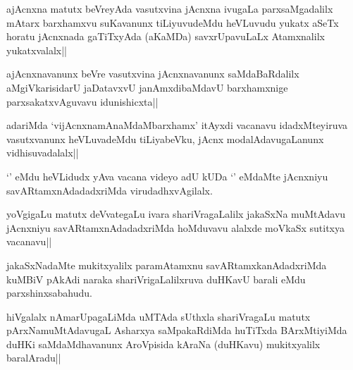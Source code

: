 
\begin{artha}
ajAcnxna matutx beVreyAda vasutxvina jAcnxna ivugaLa parxsaMgadalilx mAtarx barxhamxvu suKavanunx tiLiyuvudeMdu heVLuvudu yukatx aSeTx horatu jAcnxnada gaTiTxyAda (aKaMDa) savxrUpavuLaLx Atamxnalilx yukatxvalalx||
\end{artha}


\begin{artha}
ajAcnxnavanunx beVre vasutxvina jAcnxnavanunx saMdaBaRdalilx aMgiVkarisidarU jaDatavxvU janAmxdibaMdavU barxhamxnige parxsakatxvAguvavu idunishicxta||
\end{artha}

\begin{artha}
adariMda `vijAcnxnamAnaMdaMbarxhamx' itAyxdi vacanavu idadxMteyiruva vasutxvanunx heVLuvadeMdu tiLiyabeVku, jAcnx modalAdavugaLanunx vidhisuvadalalx||
\end{artha}

\begin{artha}
`\stext ' eMdu heVLidudx yAva vacana videyo adU kUDa `\stext ' eMdaMte jAcnxniyu savARtamxnAdadadxriMda virudadhxvAgilalx. 
\end{artha}

\begin{artha}%
yoVgigaLu matutx deVvategaLu ivara shariVragaLalilx jakaSxNa muMtAdavu jAcnxniyu savARtamxnAdadadxriMda hoMduvavu alalxde moVkaSx sutitxya vacanavu||
\end{artha}

\begin{artha}
jakaSxNadaMte mukitxyalilx paramAtamxnu savARtamxkanAdadxriMda kuMBiV pAkAdi naraka shariVrigaLalilxruva duHKavU barali eMdu parxshinxsabahudu.
\end{artha}


\begin{artha}
hiVgalalx nAmarUpagaLiMda uMTAda sUthxla shariVragaLu matutx pArxNamuMtAdavugaL Asharxya saMpakaRdiMda huTiTxda BArxMtiyiMda duHKi saMdaMdhavanunx AroVpisida kAraNa (duHKavu) mukitxyalilx baralAradu||
\end{artha}

